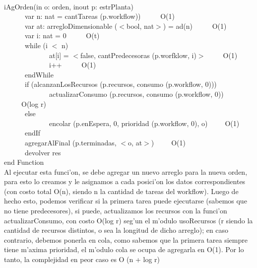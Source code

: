 \documentclass[a4paper,10pt]{article}
\begin{document}
\begin{algoritmo}
\caption{}\\
  iAgOrden(in o: orden, inout p: estrPlanta) \\
	\indent \ \ \ \ \ \ var n: nat = cantTareas (p.workflow))  \ \ \ \ \ O(1)\\
	\indent \ \ \ \ \ \ var at: arregloDimensionable ($<$bool, nat$>$) = ad(n) \ \ \ \ \ O(1)\\
	\indent \ \ \ \ \ \ var i: nat = 0  \ \ \ \ \ O(t)\\
	\indent \ \ \ \ \ \ while (i $<$ n)  \ \ \ \ \ \\
	\indent \ \ \ \ \ \ \ \ \ \ \ \ \ at[i] = $<$false, cantPredecesoras (p.worfklow, i)$>$\ \ \ \ \ O(1) \\
	\indent \ \ \ \ \ \ \ \ \ \ \ \ \ i++ \ \ \ \ \ O(1)\\
	\indent \ \ \ \ \ \ endWhile \ \ \ \ \ \\
	\indent \ \ \ \ \ \  if (alcanzanLosRecursos (p.recursos, consumo (p.workflow, 0)))  \ \ \ \ \ \\
	\indent \ \ \ \ \ \ \ \ \ \ \ \ \ actualizarConsumo (p.recursos, consumo (p.workflow, 0)) \ \ \ \ \ O(log r)\\
	\indent \ \ \ \ \ \ else \\
	\indent \ \ \ \ \ \ \ \ \ \ \ \ \ encolar (p.enEspera, 0, prioridad (p.workflow, 0), o)\ \ \ \ \ O(1) \\
	\indent \ \ \ \ \ \ endIf \\
	\indent \ \ \ \ \ \ agregarAlFinal (p.terminadas, $<$o, at$>$)\ \ \ \ \ O(1) \\
	\indent \ \ \ \ \ \ devolver res    \\
   end Function \\

Al ejecutar esta funci'on, se debe agregar un nuevo arreglo para la nueva orden, para esto lo creamos y le asignamos a cada posici'on los datos correspondientes (con costo total O(n), siendo n la cantidad de tareas del workflow). Luego de hecho esto, podemos verificar si la primera tarea puede ejecutarse (sabemos que no tiene predecesores), si puede, actualizamos los recursos con la funci'on actualizarConsumo, con costo O(log r) seg'un el m'odulo usoRecursos (r siendo la cantidad de recursos distintos, o sea la longitud de dicho arreglo); en caso contrario, debemos ponerla en cola, como sabemos que la primera tarea siempre tiene m'axima prioridad, el m'odulo cola se ocupa de agregarla en O(1). Por lo tanto, la complejidad en peor caso es O (n + log r) 

\end{algoritmo}
\end{document}
